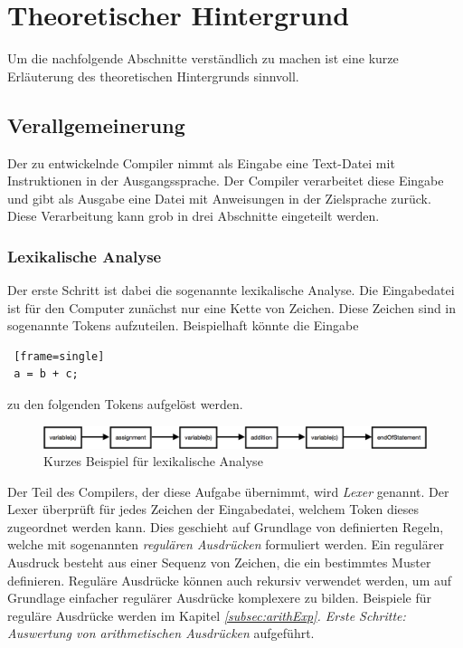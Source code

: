 
\section{Theoretischer Hintergrund}
Um die nachfolgende Abschnitte verständlich zu machen ist eine kurze Erläuterung des theoretischen Hintergrunds sinnvoll.
\subsection{Verallgemeinerung}
Der zu entwickelnde Compiler nimmt als Eingabe eine Text-Datei mit Instruktionen in der Ausgangssprache. Der Compiler verarbeitet diese Eingabe und gibt als Ausgabe eine Datei mit Anweisungen in der Zielsprache zurück. Diese Verarbeitung kann grob in drei Abschnitte eingeteilt werden.
\subsubsection{Lexikalische Analyse}
Der erste Schritt ist dabei die sogenannte lexikalische Analyse. Die Eingabedatei ist für den Computer zunächst nur eine Kette von Zeichen. Diese Zeichen sind in sogenannte Tokens aufzuteilen. Beispielhaft könnte die Eingabe
\begin{lstlisting} [frame=single]
 a = b + c;
\end{lstlisting}

zu den folgenden Tokens aufgelöst werden.


\begin{figure}[h!]
\centering
\includegraphics[scale=0.5]{pics/lex_beispiel.png}
\caption{Kurzes Beispiel für lexikalische Analyse}

\end{figure}

Der Teil des Compilers, der diese Aufgabe übernimmt, wird \textit{Lexer} genannt. Der Lexer überprüft für jedes Zeichen der Eingabedatei, welchem Token dieses zugeordnet werden kann. Dies geschieht auf Grundlage von definierten Regeln, welche mit sogenannten \textit{regulären Ausdrücken} formuliert werden. Ein regulärer Ausdruck besteht aus einer Sequenz von Zeichen, die ein bestimmtes Muster definieren. Reguläre Ausdrücke können auch rekursiv verwendet werden, um auf Grundlage einfacher regulärer Ausdrücke komplexere zu bilden. Beispiele für reguläre Ausdrücke werden im Kapitel \textit{\ref{subsec:arithExp}. Erste Schritte: Auswertung von arithmetischen Ausdrücken} aufgeführt.

